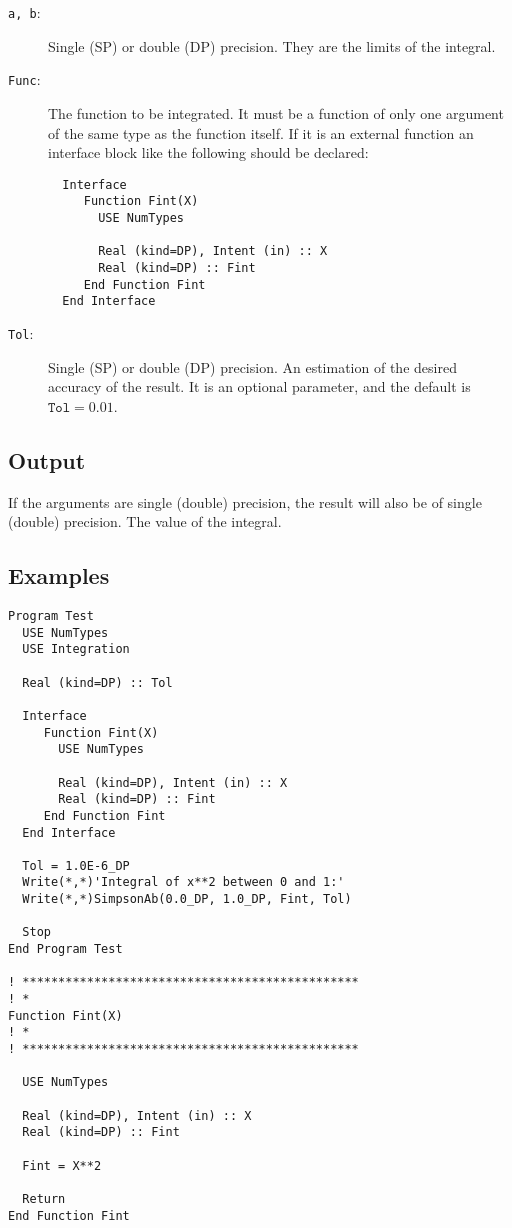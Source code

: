 \begin{description}
\item[\texttt{a, b}:] Single (SP) or double (DP) precision. They are
  the limits of the integral.
\item[\texttt{Func}:] The function to be integrated. It must be a
  function of only one argument of the same type as the function
  itself. If it is an
  external function an interface block like the following should be
  declared: 
\begin{verbatim}
  Interface 
     Function Fint(X)
       USE NumTypes

       Real (kind=DP), Intent (in) :: X
       Real (kind=DP) :: Fint
     End Function Fint
  End Interface
\end{verbatim}
\item[\texttt{Tol}:] Single (SP) or double (DP) precision. An
  estimation of the desired accuracy of the result. It is an optional
  parameter, and the default is $\mathtt{Tol} = 0.01$. 
\end{description}


\subsection{Output}

If the arguments are single (double) precision, the result will also be of
single (double) precision. The value of the integral.



\subsection{Examples}

\begin{lstlisting}[emph=SimpsonAB,
                   emphstyle=\color{blue},
                   frame=trBL,
                   caption=Exmaple of integration using the open
                   Simpson rule.,
                   label=simpsoab]
Program Test
  USE NumTypes
  USE Integration

  Real (kind=DP) :: Tol

  Interface 
     Function Fint(X)
       USE NumTypes

       Real (kind=DP), Intent (in) :: X
       Real (kind=DP) :: Fint
     End Function Fint
  End Interface

  Tol = 1.0E-6_DP
  Write(*,*)'Integral of x**2 between 0 and 1:'
  Write(*,*)SimpsonAb(0.0_DP, 1.0_DP, Fint, Tol)

  Stop
End Program Test

! ***********************************************
! *
Function Fint(X)
! *  
! ***********************************************

  USE NumTypes

  Real (kind=DP), Intent (in) :: X
  Real (kind=DP) :: Fint

  Fint = X**2

  Return
End Function Fint
\end{lstlisting}

